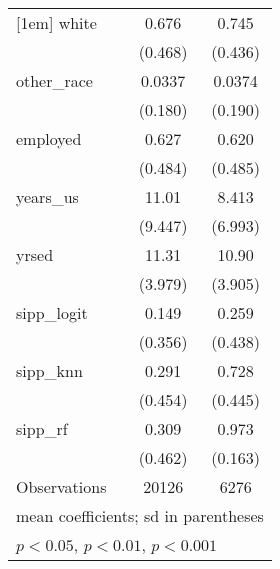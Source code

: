 \begin{table}[htbp]
\begin{tabular}{l*{2}{c}}
[1em]
white               &       0.676         &       0.745         \\
                    &     (0.468)         &     (0.436)         \\
[1em]
other\_race          &      0.0337         &      0.0374         \\
                    &     (0.180)         &     (0.190)         \\
[1em]
employed            &       0.627         &       0.620         \\
                    &     (0.484)         &     (0.485)         \\
[1em]
years\_us            &       11.01         &       8.413         \\
                    &     (9.447)         &     (6.993)         \\
[1em]
yrsed               &       11.31         &       10.90         \\
                    &     (3.979)         &     (3.905)         \\
[1em]
sipp\_logit          &       0.149         &       0.259         \\
                    &     (0.356)         &     (0.438)         \\
[1em]
sipp\_knn            &       0.291         &       0.728         \\
                    &     (0.454)         &     (0.445)         \\
[1em]
sipp\_rf             &       0.309         &       0.973         \\
                    &     (0.462)         &     (0.163)         \\
\hline
Observations        &       20126         &        6276         \\
\hline\hline
\multicolumn{3}{l}{\footnotesize mean coefficients; sd in parentheses}\\
\multicolumn{3}{l}{\footnotesize \sym{*} \(p<0.05\), \sym{**} \(p<0.01\), \sym{***} \(p<0.001\)}\\
\end{tabular}
\end{table}
